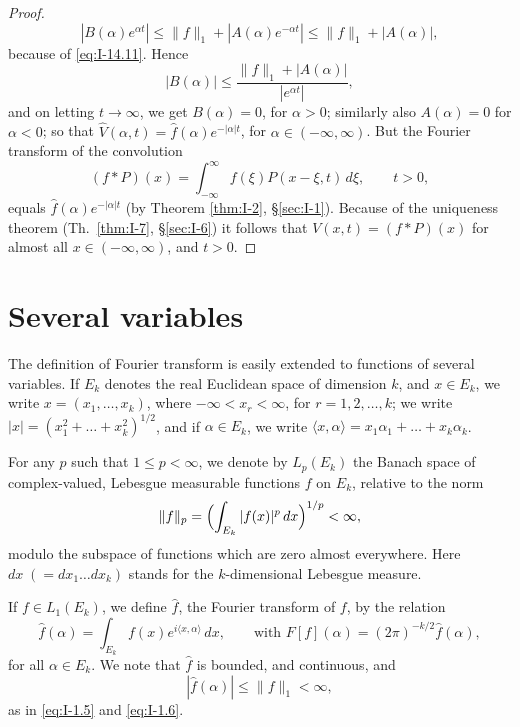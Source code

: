 \begin{proof}
\begin{equation*}
|B(\alpha)e^{\alpha t}|\le\|f\|_1+|A(\alpha)e^{-\alpha t}|\le\|f\|_1+|A(\alpha)|,
\end{equation*}
because of \eqref{eq:I-14.11}. Hence
\begin{equation*}
|B(\alpha)|\le\frac{\|f\|_1+|A(\alpha)|}{|e^{\alpha t}|},
\end{equation*}
and on letting $t\to\infty$, we get $B(\alpha)=0$, for $\alpha>0$; similarly also $A(\alpha)=0$ for $\alpha<0$; so that $\widehat V(\alpha,t)=\widehat f(\alpha)e^{-|\alpha|t}$, for $\alpha\in(-\infty,\infty)$. But the Fourier transform of the convolution
\begin{equation*}
(f*P)(x)=\int_{-\infty}^{\infty}f(\xi)P(x-\xi,t)\,d\xi,\qquad t>0,
\end{equation*}
equals $\widehat f(\alpha)e^{-|\alpha|t}$ (by Theorem \ref{thm:I-2}, \S\ref{sec:I-1}). Because of the uniqueness theorem (Th.~\ref{thm:I-7}, \S\ref{sec:I-6}) it follows that $V(x,t)=(f*P)(x)$ for almost all $x\in(-\infty,\infty)$, and $t>0$.
\end{proof}

\section{Several variables}
\label{sec:I-15}

The definition of Fourier transform is easily extended to functions of several variables. If $E_k$ denotes the real Euclidean space of dimension $k$, and $x\in E_k$, we write $x=(x_1,\ldots,x_k)$, where $-\infty<x_r<\infty$, for $r=1,2,\ldots,k$; we write $|x|=(x_1^{2}+\ldots+x_k^{2})^{1/2}$, and if $\alpha\in E_k$, we write $\langle x,\alpha\rangle=x_1\alpha_1+\ldots+x_k\alpha_k$.

For any $p$ such that $1\le p<\infty$, we denote by $L_p(E_k)$ the Banach space of complex-valued, Lebesgue measurable functions $f$ on $E_k$, relative to the norm
\begin{equation*}
\|f\|_p=\Bigl(\int_{E_k}|f(x)|^p\,dx\Bigr)^{1/p}<\infty,
\end{equation*}
modulo the subspace of functions which are zero almost everywhere. Here $dx\;(=dx_1\ldots dx_k)$ stands for the $k$-dimensional Lebesgue measure.

If $f\in L_1(E_k)$, we define $\widehat f$, the Fourier transform of $f$, by the relation
\begin{equation}\label{eq:I-15.1}\tag{15.1}
\widehat f(\alpha)=\int_{E_k}f(x)e^{i\langle x,\alpha\rangle}\,dx,\qquad\text{with }F[f](\alpha)=(2\pi)^{-k/2}\widehat f(\alpha),
\end{equation}
for all $\alpha\in E_k$. We note that $\widehat f$ is bounded, and continuous, and
\begin{equation}\label{eq:I-15.2}\tag{15.2}
|\widehat f(\alpha)|\le\|f\|_1<\infty,
\end{equation}
as in \eqref{eq:I-1.5} and \eqref{eq:I-1.6}.

